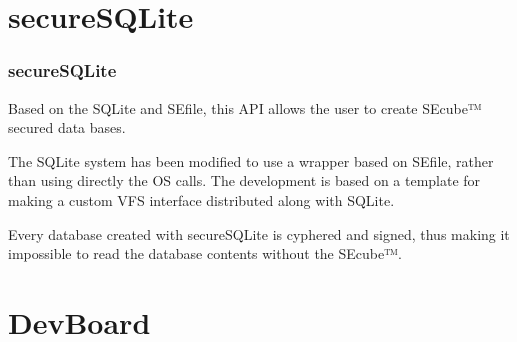 \documentclass[14pt,usenames,dvipsnames]{beamer}
\begin{document}
\section*{secureSQLite}

\begin{frame}
	\frametitle{secureSQLite}
	
	Based on the {\color{NavyBlue} SQLite} and {\color{NavyBlue} SEfile}, this API allows the user to create SEcube™ secured data bases.
	
	\vspace{7pt}
	
  The SQLite system has been modified to use a wrapper based on SEfile, rather than using directly the OS calls. The development is based on a template for making a custom {\color{NavyBlue} VFS} interface distributed along with SQLite.

\vspace{7pt}

Every database created with secureSQLite is cyphered and signed, thus making it impossible to read the database contents without the SEcube™.
\end{frame}

\section*{DevBoard}
\end{document}
